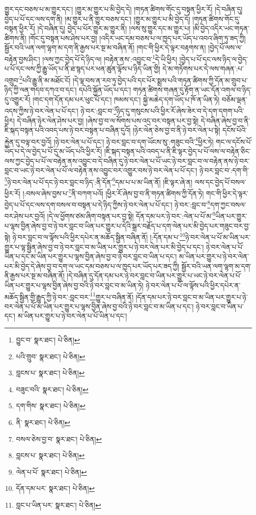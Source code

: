 གྱུར་དང་བཅས་པ་མ་གྱུར་དང་། །གྱུར་མ་གྱུར་པ་མི་བྱེད་དེ། །གཏན་ཚིགས་གོང་དུ་བསྟན་ཕྱིར་རོ། །དེ་བཞིན་དུ། བྱེད་པ་པོ་དང་ལས་དག་ནི། །མ་གྱུར་པ་ནི་གྱུར་བཅས་དང་། །གྱུར་མ་གྱུར་པ་མི་བྱེད་དོ། །གཏན་ཚིགས་གོང་དུ་བསྟན་ཕྱིར་རོ། །དེ་བཞིན་དུ། བྱེད་པ་པོར་གྱུར་མ་གྱུར་ནི། །ལས་སུ་གྱུར་དང་མ་གྱུར་པ། །མི་བྱེད་འདིར་ཡང་གཏན་ཚིགས་ནི། །གོང་དུ་བསྟན་པས་ཤེས་པར་བྱ། །འདིར་ཡང་དམ་བཅས་པ་ལ་ཁྱད་པར་ཡོད་པ་འབའ་ཞིག་ཏུ་ཟད་ཀྱི། སྦྱོར་བའི་ཡན་ལག་ལྷག་མ་དག་ནི་རྒྱས་པར་སྔ་མ་བཞིན་ནོ། །གང་གི་ཕྱིར་དེ་ལྟར་བརྟགས་ན། །བྱེད་པོ་ལས་ལ་བརྟེན་བྱས་ཤིང་། །ལས་ཀྱང་བྱེད་པོ་དེ་ཉིད་ལ། །བརྟེན་ནས་:འབྱུང་བ་\footnote{བྱུང་བ་  སྣར་ཐང་།  པེ་ཅིན། }དེ་ཡི་ཕྱིར། །བྱེད་པ་པོ་དང་ལས་ཉིད་ལ་བྱེད་པ་པོ་དང་ལས་ཀྱི་རྒྱུ་ཡོད་པ་ནི་ཐ་སྙད་པར་ཕན་ཚུན་ལྟོས་པ་ཉིད་ཡིན་གྱི། དེ་མ་གཏོགས་པར་དེ་ལས་གཞན་:པ་འགྲུབ་\footnote{པའི་གྲུབ་  སྣར་ཐང་།  པེ་ཅིན། }པའི་རྒྱུ་ནི་མ་མཐོང་ངོ། །དེ་ལྟ་བས་ན་རབ་ཏུ་བྱེད་པའི་དང་པོར་སྨྲས་པའི་གཏན་ཚིགས་ཀྱི་དོན་མ་གྲུབ་པ་ཉིད་ཀྱི་ལན་གདབ་དཀའ་བ་དང་། དཔེའི་སྐྱོན་ཡོད་པ་དང་། གཏན་ཚིགས་གཞན་དུ་རྟོག་ན་ཡང་དོན་འགལ་བ་ཉིད་དུ་འགྱུར་རོ། །གང་དག་དོན་དམ་པར་ཕུང་པོ་དང་། ཁམས་དང་། སྐྱེ་མཆེད་དག་ཡོད་པ་ཁོ་ན་ཡིན་ཏེ། བཅོམ་ལྡན་འདས་ཀྱིས་ཉེ་བར་ལེན་པ་པོ་དང་། ཉེ་བར་:བླང་བ་\footnote{བླངས་པ་  སྣར་ཐང་།  པེ་ཅིན། }ཉིད་དུ་གསུངས་པའི་ཕྱིར་རོ་ཞེས་ཟེར་བ་དེ་དག་དགག་པའི་ཕྱིར། དེ་བཞིན་ཉེར་ལེན་ཤེས་པར་བྱ། །ཞེས་བྱ་བ་ལ་སོགས་པས་འདྲ་བར་བསྟན་པར་བྱ་སྟེ། དེ་བཞིན་ཞེས་བྱ་བ་ནི་ཇི་སྐད་བསྟན་པའི་འབད་པས་ཉེ་བར་བསྟན་པ་བཞིན་དུའོ། །ཉེར་ལེན་ཅེས་བྱ་བ་ནི་ཉེ་བར་ལེན་པ་སྟེ། དངོས་པོའི་རྐྱེན་དུ་བལྟ་བར་བྱའོ། །ཉེ་བར་ལེན་པ་པོ་དང་། ཉེ་བར་བླང་བ་དག་ཡོངས་སུ་:གཟུང་བའི་\footnote{བཟུང་བའི་  སྣར་ཐང་།  པེ་ཅིན། }ཕྱིར་ཏེ། གང་ལ་དངོས་པོ་ཡོད་པ་དེ་ལ་བྱེད་པ་པོ་དུ་མ་ཡོད་པའི་ཕྱིར་རོ། །ཇི་སྐད་བསྟན་པའི་འབད་པ་ནི་ཇི་ལྟར་བྱེད་པ་པོ་ལས་ལ་བརྟེན་ཅིང་ལས་ཀྱང་བྱེད་པ་པོ་ལ་བརྟེན་ནས་འབྱུང་བ་དེ་བཞིན་དུ་ཉེ་བར་ལེན་པ་པོ་ཡང་ཉེ་བར་བླང་བ་ལ་བརྟེན་ནས་ཉེ་བར་བླང་བ་ཡང་ཉེ་བར་ལེན་པ་པོ་ལ་བརྟེན་ནས་འབྱུང་བར་འགྱུར་བས་ཉེ་བར་ལེན་པ་པོ་དང་། ཉེ་བར་བླང་བ་:དག་གི་\footnote{དག་གིས་  སྣར་ཐང་།  པེ་ཅིན། }ཉེ་བར་ལེན་པ་པོ་དང་ཉེ་བར་བླང་བ་ཉིད་:ནི་དོན་\footnote{ནི་  སྣར་ཐང་།  པེ་ཅིན། }དམ་པ་པ་མ་ཡིན་ནོ། །ཇི་ལྟར་ཞེ་ན། ལས་དང་བྱེད་པོ་བསལ་ཕྱིར་རོ། །:བསལ་ཞེས་བྱས་པ་\footnote{བསལ་ཅེས་བྱ་བ་  སྣར་ཐང་།  པེ་ཅིན། }ནི་བཀག་པའོ། །ཕྱིར་རོ་ཞེས་བྱ་བ་ནི་གཏན་ཚིགས་ཀྱི་དོན་ཏེ། གང་གི་ཕྱིར་དེ་ལྟར་བྱེད་པ་པོ་དང་ལས་དག་བསལ་བ་བསྟན་པ་དེ་ཉིད་ཀྱིས་ཉེ་བར་ལེན་པ་པོ་དང་། ཉེ་བར་:བླང་བ་\footnote{བླངས་པ་  སྣར་ཐང་།  པེ་ཅིན། }དག་ཀྱང་བསལ་བར་ཤེས་པར་བྱའོ། །དེ་ལ་ཕྱོགས་ཙམ་ཞིག་བསྟན་པར་བྱ་སྟེ། དོན་དམ་པར་ཉེ་བར་:ལེན་པ་པོ་མ་\footnote{ལེན་པ་པོ་  སྣར་ཐང་།  པེ་ཅིན། }ཡིན་པར་གྱུར་པ་ལྷས་བྱིན་ཞེས་བྱ་བ་ཉེ་བར་བླང་བ་ཡིན་པར་གྱུར་པ་དེའི་སྒྲར་བརྗོད་པ་དག་ལེན་པར་མི་བྱེད་པར་གཟུང་བར་བྱ་སྟེ། ཉེ་བར་བླང་བ་ལ་ལྟོས་པའི་ཕྱིར་དཔེར་ན་མཆོད་སྦྱིན་བཞིན་ནོ། །:དོན་དམ་པ་\footnote{དོན་དམ་པར་  སྣར་ཐང་།  པེ་ཅིན། }ཉེ་བར་ལེན་པ་པོ་མ་ཡིན་པར་གྱུར་པ་ལྷ་སྦྱིན་ཞེས་བྱ་བ་ཉེ་བར་བླང་བ་མ་ཡིན་པར་གྱུར་པ་ཉེ་བར་ལེན་པར་མི་བྱེད་པ་དང་། ཉེ་བར་ལེན་པ་པོ་ཡིན་པ་དང་མ་ཡིན་པར་གྱུར་པ་ལྷས་བྱིན་ཞེས་བྱ་བ་ཉེ་བར་བླང་བ་ཡིན་པ་དང་། མ་ཡིན་པར་གྱུར་པ་ཉེ་བར་ལེན་པར་མི་བྱེད་དེ་ཞེས་བྱ་བ་དག་ལ་ཡང་དམ་བཅས་པ་ལ་ཁྱད་པར་ཡོད་པར་ཟད་ཀྱི། སྦྱོར་བའི་ཡན་ལག་ལྷག་མ་དག་ནི་རྒྱས་པར་སྔ་མ་བཞིན་ནོ། །དེ་བཞིན་དུ་དོན་དམ་པར་ཉེ་བར་བླང་བ་ཡིན་པར་གྱུར་པ་ཡང་ཉེ་བར་ལེན་པ་པོ་ཡིན་པར་གྱུར་པ་ལྷས་བྱིན་ཞེས་བྱ་བའི་ཉེ་བར་བླང་བ་མ་ཡིན་ཏེ། ཉེ་བར་ལེན་པ་པོ་ལ་ལྟོས་པའི་ཕྱིར་དཔེར་ན་མཆོད་སྦྱིན་གྱི་རྒྱུད་ཀྱི་ཉེ་བར་:བླང་བར་\footnote{བླང་པ་ཡིན་པར་  སྣར་ཐང་།  པེ་ཅིན། }གྱུར་པ་བཞིན་ནོ། །དོན་དམ་པར་ཉེ་བར་བླང་བ་མ་ཡིན་པར་གྱུར་པ་ཉེ་བར་ལེན་པ་པོ་མ་ཡིན་པར་གྱུར་པ་ལྷས་བྱིན་ཞེས་བྱ་བའི་ཉེ་བར་བླང་བ་མ་ཡིན་པ་དང་། ཉེ་བར་བླང་བ་ཡིན་པ་དང་། མ་ཡིན་པར་གྱུར་པ་ཉེ་བར་ལེན་པ་པོ་ཡིན་པ་དང་། 